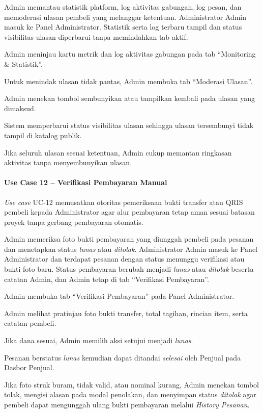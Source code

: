 {Admin memantau statistik platform, log aktivitas gabungan, log pesan, dan memoderasi ulasan pembeli yang melanggar ketentuan.}
{Administrator}
{Admin masuk ke Panel Administrator.}
{Statistik serta log terbaru tampil dan status visibilitas ulasan diperbarui tanpa memindahkan tab aktif.}
{\begin{uclist}
  \item Admin meninjau kartu metrik dan log aktivitas gabungan pada tab ``Monitoring \& Statistik''.
  \item Untuk menindak ulasan tidak pantas, Admin membuka tab ``Moderasi Ulasan''.
  \item Admin menekan tombol sembunyikan atau tampilkan kembali pada ulasan yang dimaksud.
  \item Sistem memperbarui status visibilitas ulasan sehingga ulasan tersembunyi tidak tampil di katalog publik.
\end{uclist}}
{\begin{ucbullet}
  \item Jika seluruh ulasan sesuai ketentuan, Admin cukup memantau ringkasan aktivitas tanpa menyembunyikan ulasan.
\end{ucbullet}}

\paragraph{Use Case 12 -- Verifikasi Pembayaran Manual}
\textit{Use case} UC-12 memusatkan otoritas pemeriksaan bukti transfer atau QRIS pembeli kepada Administrator agar alur pembayaran tetap aman sesuai batasan proyek tanpa gerbang pembayaran otomatis.

{Admin memeriksa foto bukti pembayaran yang diunggah pembeli pada pesanan dan menetapkan status \textit{lunas} atau \textit{ditolak}.}
{Administrator}
{Admin masuk ke Panel Administrator dan terdapat pesanan dengan status menunggu verifikasi atau bukti foto baru.}
{Status pembayaran berubah menjadi \textit{lunas} atau \textit{ditolak} beserta catatan Admin, dan Admin tetap di tab ``Verifikasi Pembayaran''.}
{\begin{uclist}
  \item Admin membuka tab ``Verifikasi Pembayaran'' pada Panel Administrator.
  \item Admin melihat pratinjau foto bukti transfer, total tagihan, rincian item, serta catatan pembeli.
  \item Jika dana sesuai, Admin memilih aksi setujui menjadi \textit{lunas}.
  \item Pesanan berstatus \textit{lunas} kemudian dapat ditandai \textit{selesai} oleh Penjual pada Dasbor Penjual.
\end{uclist}}
{\begin{ucbullet}
  \item Jika foto struk buram, tidak valid, atau nominal kurang, Admin menekan tombol tolak, mengisi alasan pada modal penolakan, dan menyimpan status \textit{ditolak} agar pembeli dapat mengunggah ulang bukti pembayaran melalui \textit{History Pesanan}.
\end{ucbullet}}

